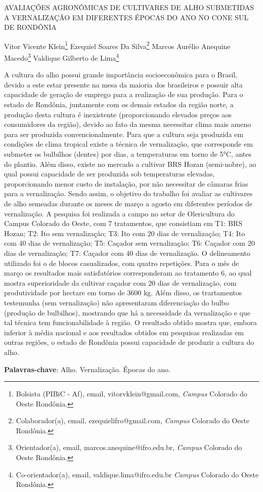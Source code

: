 \documentclass[article,12pt,onesidea,4paper,english,brazil]{abntex2}
\begin{document}
	
	
	\frenchspacing 
	
	\begin{center}
		\LARGE AVALIAÇÕES AGRONÔMICAS DE CULTIVARES DE ALHO SUBMETIDAS A
		VERNALIZAÇÃO EM DIFERENTES ÉPOCAS DO ANO NO CONE SUL DE	
		RONDÔNIA
		
		\normalsize
		Vitor Vicente Klein\footnote{Bolsista (PIBiC - Af), email, vitorvklein@gmail.com, \textit{Campus} Colorado do Oeste Rondônia.} 
		Ezequiel Soares Da Silva\footnote{Colaborador(a), email, ezequielifro@gmail.com, \textit{Campus} Colorado do Oeste Rondônia.} 
		Marcos Aurélio Anequine Macedo\footnote{Orientador(a), email, marcos.anequine@ifro.edu.br, \textit{Campus} Colorado do Oeste Rondônia.} 
		Valdique Gilberto de Lima\footnote{Co-orientador(a), email, valdique.lima@ifro.edu.br \textit{Campus} Colorado do Oeste Rondônia.} 
	\end{center}
	
	\noindent A cultura do alho possui grande importância socioeconômica para o Brasil, devido a
	este estar presente na mesa da maioria dos brasileiros e possuir alta capacidade de
	geração de emprego para a realização de sua produção. Para o estado de
	Rondônia, juntamente com os demais estados da região norte, a produção desta
	cultura é inexistente (proporcionando elevados preços aos consumidores da região),
	devido ao fato da mesma necessitar clima mais ameno para ser produzida
	convencionalmente. Para que a cultura seja produzida em condições de clima
	tropical existe a técnica de vernalização, que corresponde em submeter os bulbilhos
	(dentes) por dias, a temperaturas em torno de 5°C, antes do plantio. Além disso,
	existe no mercado a cultivar BRS Hozan (semi-nobre), ao qual possui capacidade de
	ser produzida sob temperaturas elevadas, proporcionando menor custo de
	instalação, por não necessitar de câmaras frias para a vernalização. Sendo assim, o
	objetivo do trabalho foi avaliar as cultivares de alho semeadas durante os meses de
	março a agosto em diferentes períodos de vernalização. A pesquisa foi realizada a
	campo no setor de Olericultura do Campus Colorado do Oeste, com 7 tratamentos,
	que consistiam em T1: BRS Hozan; T2: Ito sem vernalização; T3: Ito com 20 dias de
	vernalização; T4: Ito com 40 dias de vernalização; T5: Caçador sem vernalização;
	T6: Caçador com 20 dias de vernalização; T7: Caçador com 40 dias de vernalização.
	O delineamento utilizado foi o de blocos casualizados, com quatro repetições. Para o
	mês de março os resultados mais satisfatórios corresponderam ao tratamento 6, ao
	qual mostra superioridade da cultivar caçador com 20 dias de vernalização, com
	produtividade por hectare em torno de 3600 kg. Além disso, os trartamentos
	testemunha (sem vernalização) não apresentaram diferenciação do bulbo (produção
	de bulbilhos), mostrando que há a necessidade da vernalização e que tal técnica
	tem funcionabilidade à região. O resultado obtido mostra que, embora inferior à
	média nacional e aos resultados obtidos em pesquisas realizadas em outras regiões,
	o estado de Rondônia possui capacidade de produzir a cultura do alho.
	
	\vspace{\onelineskip}
	
	\noindent
	\textbf{Palavras-chave}: Alho. Vernalização. Épocas do ano.
	
\end{document}
